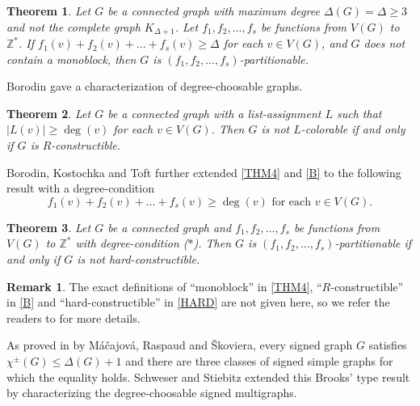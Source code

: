 \documentclass{article}
\newtheorem{theorem}{Theorem}[section]
\theoremstyle{definition}
\newtheorem{remark}{Remark}
\begin{document}
\begin{theorem}\label{THM4}
Let $G$ be a connected graph with maximum degree $\Delta(G) = \Delta \geq 3$ and not the complete graph $K_{\Delta + 1}$. Let $f_{1}, f_{2}, \dots, f_{s}$ be functions from $V(G)$ to $\mathbb{Z}^{*}$. If $f_{1}(v) + f_{2}(v) + \dots + f_{s}(v) \geq \Delta$ for each $v \in V(G)$, and $G$ does not contain a monoblock, then $G$ is $(f_{1}, f_{2}, \dots, f_{s})$-partitionable. 
\end{theorem}


Borodin gave a characterization of degree-choosable graphs. 

\begin{theorem}\label{B}
Let $G$ be a connected graph with a list-assignment $L$ such that $|L(v)| \geq \deg(v)$ for each $v \in V(G)$. Then $G$ is not $L$-colorable if and only if $G$ is $R$-constructible. 
\end{theorem}

Borodin, Kostochka and Toft \cite{MR1743629} further extended \autoref{THM4} and \autoref{B} to the following result with a degree-condition 
\begin{equation*}
\text{$f_{1}(v) + f_{2}(v) + \dots + f_{s}(v) \geq \deg(v)$ for each $v \in V(G)$.}\tag{$\ast$}
\end{equation*}

\begin{theorem}\label{HARD}
Let $G$ be a connected graph and $f_{1}, f_{2}, \dots, f_{s}$ be functions from $V(G)$ to $\mathbb{Z}^{*}$ with degree-condition ($\ast$). Then $G$ is $(f_{1}, f_{2}, \dots, f_{s})$-partitionable if and only if $G$ is not hard-constructible.  
\end{theorem}

\begin{remark}
The exact definitions of ``monoblock'' in \autoref{THM4}, ``$R$-constructible'' in \autoref{B} and ``hard-constructible'' in \autoref{HARD} are not given here, so we refer the readers to \cite{MR1743629} for more details. 
\end{remark}

As proved in \cite{MR3484719} by M\'a\v{c}ajov\'a, Raspaud and \v{S}koviera, every signed graph $G$ satisfies $\chi^{\pm}(G) \leq \Delta(G) + 1$ and there are three classes of signed simple graphs for which the equality holds. Schweser and Stiebitz \cite{MR3612419} extended this Brooks' type result by characterizing the degree-choosable signed multigraphs. 
\end{document}
